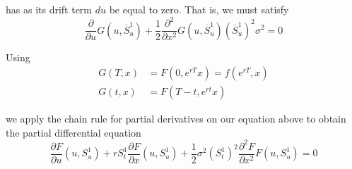 \documentclass[12pt]{article}
\begin{document}
has as its drift term $du$ be  equal to zero. That is, we must satisfy
\begin{equation*}
	\frac{\partial}{\partial u} G(u, \overline{S}^1_u) + \frac{1}{2}\frac{\partial^2}{\partial x^2} G(u, \overline{S}^1_u)(\overline{S}^1_u)^2\sigma^2 = 0
\end{equation*}

Using 
\begin{align*}
	G(T,x) &= F(0, e^{rT}x) = f(e^{rT},x) \\
	G(t,x) &= F(T - t, e^{rt}x)
\end{align*}

we apply the chain rule for partial derivatives on our equation above to obtain the partial differential equation
\begin{equation*}
	\frac{\partial F}{\partial u}(u, S^1_u) + rS^1_t\frac{\partial F}{\partial x}(u, S^1_u) + \frac{1}{2}\sigma^2(S^1_t)^2\frac{\partial^2 F}{\partial x^2}F(u, S^1_u) = 0
\end{equation*}
\end{document}
